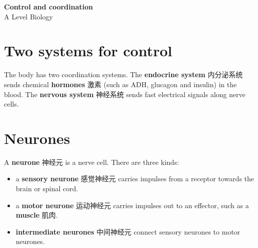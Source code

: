 \documentclass[11pt]{article}
\begin{document}
\begin{center}
  {\LARGE\bfseries Control and coordination}\\[0.35em]
  {\large A Level Biology}
\end{center}
\vspace{0.6em}

\section*{Two systems for control}

The body has two coordination systems. The \textbf{endocrine system} 内分泌系统 sends chemical \textbf{hormones} 激素 (such as ADH, glucagon and insulin) in the blood. The \textbf{nervous system} 神经系统 sends fast electrical signals along nerve cells.

\begin{center}
\end{center}

\section*{Neurones}

A \textbf{neurone} 神经元 is a nerve cell. There are three kinds:

\begin{itemize}
\item a \textbf{sensory neurone} 感觉神经元 carries impulses from a receptor towards the brain or spinal cord.

\item a \textbf{motor neurone} 运动神经元 carries impulses out to an effector, such as a \textbf{muscle} 肌肉.

\item \textbf{intermediate neurones} 中间神经元 connect sensory neurones to motor neurones.

\end{itemize}
\end{document}
